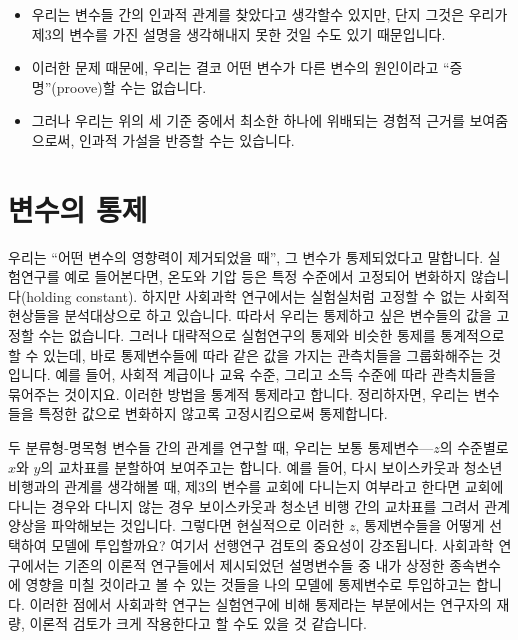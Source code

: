 \documentclass[]{book}
\providecommand{\tightlist}{%
  \setlength{\itemsep}{0pt}\setlength{\parskip}{0pt}}
\begin{document}
\begin{itemize}
\begin{itemize}
    \begin{itemize}
    \tightlist
    \item
      우리는 변수들 간의 인과적 관계를 찾았다고 생각할수 있지만, 단지 그것은 우리가 제3의 변수를 가진 설명을 생각해내지 못한 것일 수도 있기 때문입니다.
    \item
      이러한 문제 때문에, 우리는 결코 어떤 변수가 다른 변수의 원인이라고 ``증명''(proove)할 수는 없습니다.
    \item
      그러나 우리는 위의 세 기준 중에서 최소한 하나에 위배되는 경험적 근거를 보여줌으로써, 인과적 가설을 반증할 수는 있습니다.
    \end{itemize}
  \end{itemize}
\end{itemize}

\hypertarget{uxbcc0uxc218uxc758-uxd1b5uxc81c}{%
\section{변수의 통제}\label{uxbcc0uxc218uxc758-uxd1b5uxc81c}}

우리는 ``어떤 변수의 영향력이 제거되었을 때'', 그 변수가 통제되었다고 말합니다. 실험연구를 예로 들어본다면, 온도와 기압 등은 특정 수준에서 고정되어 변화하지 않습니다(holding constant). 하지만 사회과학 연구에서는 실험실처럼 고정할 수 없는 사회적 현상들을 분석대상으로 하고 있습니다. 따라서 우리는 통제하고 싶은 변수들의 값을 고정할 수는 없습니다. 그러나 대략적으로 실험연구의 통제와 비슷한 통제를 통계적으로 할 수 있는데, 바로 통제변수들에 따라 같은 값을 가지는 관측치들을 그룹화해주는 것입니다. 예를 들어, 사회적 계급이나 교육 수준, 그리고 소득 수준에 따라 관측치들을 묶어주는 것이지요. 이러한 방법을 통계적 통제라고 합니다. 정리하자면, 우리는 변수들을 특정한 값으로 변화하지 않고록 고정시킴으로써 통제합니다.

두 분류형-명목형 변수들 간의 관계를 연구할 때, 우리는 보통 통제변수---\(z\)의 수준별로 \(x\)와 \(y\)의 교차표를 분할하여 보여주고는 합니다. 예를 들어, 다시 보이스카웃과 청소년 비행과의 관계를 생각해볼 때, 제3의 변수를 교회에 다니는지 여부라고 한다면 교회에 다니는 경우와 다니지 않는 경우 보이스카웃과 청소년 비행 간의 교차표를 그려서 관계양상을 파악해보는 것입니다. 그렇다면 현실적으로 이러한 \(z\), 통제변수들을 어떻게 선택하여 모델에 투입할까요? 여기서 선행연구 검토의 중요성이 강조됩니다. 사회과학 연구에서는 기존의 이론적 연구들에서 제시되었던 설명변수들 중 내가 상정한 종속변수에 영향을 미칠 것이라고 볼 수 있는 것들을 나의 모델에 통제변수로 투입하고는 합니다. 이러한 점에서 사회과학 연구는 실험연구에 비해 통제라는 부분에서는 연구자의 재량, 이론적 검토가 크게 작용한다고 할 수도 있을 것 같습니다.
\end{document}
